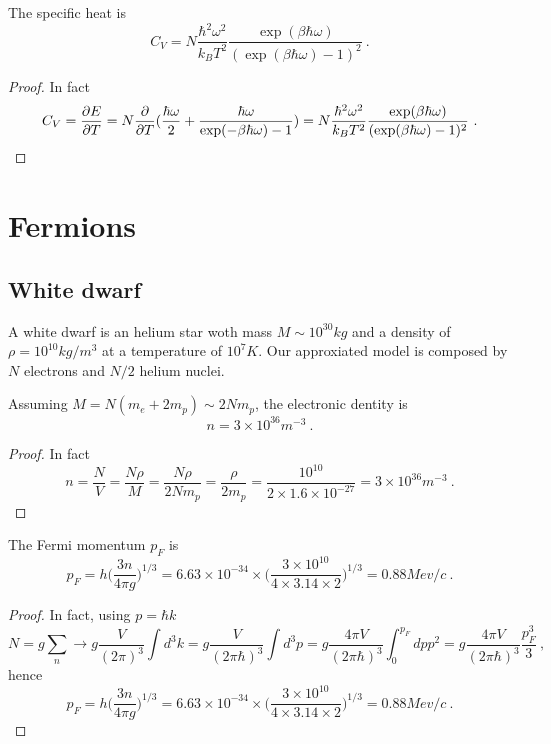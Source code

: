     The specific heat is 
    \begin{equation*}
        C_V = N \frac{\hbar^2 \omega^2}{k_B T^2} \frac{\exp(\beta \hbar \omega)}{(\exp(\beta \hbar \omega) - 1)^2} ~.
    \end{equation*}
    \begin{proof}
        In fact 
        \begin{equation*}
            C_V = \frac{\partial E}{\partial T} = N \frac{\partial}{\partial T} ( \frac{\hbar \omega}{2} + \frac{\hbar \omega}{\exp(- \beta \hbar \omega) - 1} ) = N \frac{\hbar^2 \omega^2}{k_B T^2} \frac{\exp(\beta \hbar \omega)}{(\exp(\beta \hbar \omega) - 1)^2} ~.
        \end{equation*}
    \end{proof}

\chapter{Fermions}

\section{White dwarf}

    A white dwarf is an helium star woth mass $M \sim 10^{30} kg$ and a density of $\rho = 10^{10} kg/m^3$ at a temperature of $10^{7} K$. Our approxiated model is composed by $N$ electrons and $N/2$ helium nuclei.

    Assuming $M = N(m_e + 2 m_p) \sim 2 N m_p$, the electronic dentity is 
    \begin{equation*}
        n = 3 \times 10^{36} m^{-3} ~.
    \end{equation*}
    \begin{proof}
        In fact 
        \begin{equation*}
            n = \frac{N}{V} = \frac{N \rho}{M} = \frac{N \rho}{2 N m_p} = \frac{\rho}{2 m_p} = \frac{10^{10}}{2 \times 1.6 \times 10^{-27}} = 3 \times 10^{36} m^{-3} ~.
        \end{equation*}
    \end{proof}

    The Fermi momentum $p_F$ is 
    \begin{equation*}
        p_F = h \Big ( \frac{3 n}{4 \pi g} \Big)^{1/3} = 6.63 \times 10^{-34}  \times \Big ( \frac{3 \times 10^{10}}{4 \times 3.14 \times 2} \Big)^{1/3} = 0.88 Mev/c ~.
    \end{equation*}
    \begin{proof}
        In fact, using $p = \hbar k$
        \begin{equation*}
            N = g \sum_{n} \rightarrow g \frac{V}{(2\pi)^3} \int d^3 k = g \frac{V}{(2\pi \hbar)^3} \int d^3 p = g \frac{4 \pi V}{(2\pi \hbar)^3} \int_0^{p_F} dp p^2 = g \frac{4 \pi V}{(2\pi \hbar)^3} \frac{p_F^3}{3} ~,
        \end{equation*}
        hence 
        \begin{equation*}
            p_F = h \Big ( \frac{3 n}{4 \pi g} \Big)^{1/3} = 6.63 \times 10^{-34}  \times \Big ( \frac{3 \times 10^{10}}{4 \times 3.14 \times 2} \Big)^{1/3} = 0.88 Mev/c ~.
        \end{equation*}
    \end{proof}

